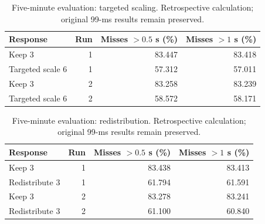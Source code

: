 \begin{table}[!htbp]
\centering\small
\setlength{\tabcolsep}{3pt}
\renewcommand{\arraystretch}{1.12}
\begin{tabular}{@{}lrrr@{}}
\toprule
Response & Run & Misses $>0.5$ s (\%) & Misses $>1$ s (\%)\\
\midrule
Keep 3 & 1 & 83.447 & 83.418\\
Targeted scale 6 & 1 & 57.312 & 57.011\\
Keep 3 & 2 & 83.258 & 83.239\\
Targeted scale 6 & 2 & 58.572 & 58.171\\
\bottomrule
\end{tabular}
\caption{Five-minute evaluation: targeted scaling. Retrospective calculation; original 99-ms results remain preserved.}
\label{tab:short-targeted-scaling-deadline-sensitivity}
\end{table}
\begin{table}[!htbp]
\centering\small
\setlength{\tabcolsep}{3pt}
\renewcommand{\arraystretch}{1.12}
\begin{tabular}{@{}lrrr@{}}
\toprule
Response & Run & Misses $>0.5$ s (\%) & Misses $>1$ s (\%)\\
\midrule
Keep 3 & 1 & 83.438 & 83.413\\
Redistribute 3 & 1 & 61.794 & 61.591\\
Keep 3 & 2 & 83.278 & 83.241\\
Redistribute 3 & 2 & 61.100 & 60.840\\
\bottomrule
\end{tabular}
\caption{Five-minute evaluation: redistribution. Retrospective calculation; original 99-ms results remain preserved.}
\label{tab:short-redistribution-deadline-sensitivity}
\end{table}
